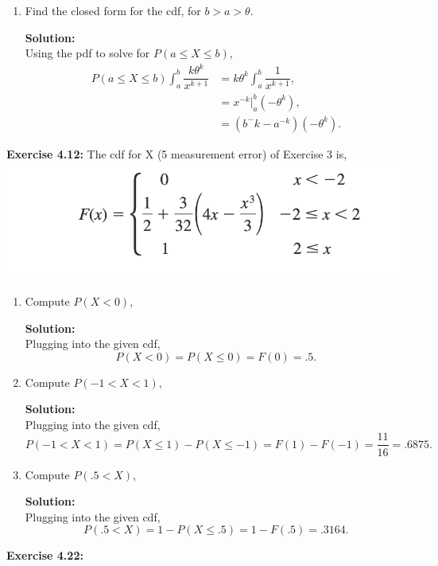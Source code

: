 \documentclass[12pt]{article}
\theoremstyle{homework}
\newcommand{\localhead}[1]{\par\smallskip\noindent\textbf{#1}\nobreak\\}%
\newcommand\solution{\localhead{Solution:}}
\begin{document}
\begin{enumerate}
\vspace{.25in}


\item Find the closed form for the cdf, for $b > a >\theta$.\\

\solution Using the pdf to solve for $P(a \le X \le b)$,
\begin{align*}
  P(a \le X \le b)\int_{a}^{b} \dfrac{k\theta^k}{x^{k+1}} &= k\theta^k \int_{a}^{b} \dfrac{1}{x^{k+1}},\\
  &= x^{-k}|_a^{b}(-\theta^k),\\
  &=(b^-k - a^{-k}) (-\theta^k).
\end{align*}

 \end{enumerate}

 \vspace{.5in}









 \hspace{.5in}\textbf{Exercise 4.12:} The cdf for X (5 measurement error) of Exercise 3 is,
 \center
 \includegraphics[width = \textwidth]{pdf2.png}
 \center
\begin{enumerate}
  \item Compute $P(X<0)$,
  \solution Plugging into the given cdf,
  \begin{equation*}
    P(X<0) = P(X \le 0) = F(0) = .5 .
  \end{equation*}
  \vspace{.25in}


  \item Compute $P(-1< X < 1)$,
  \solution Plugging into the given cdf,
  \begin{equation*}
    P(-1< X < 1) = P(X \le 1) - P(X \le -1)  = F(1) - F(-1) = \dfrac{11}{16} = .6875.
  \end{equation*}
  \vspace{.25in}



  \item Compute $P(.5 < X )$,
  \solution Plugging into the given cdf,
  \begin{equation*}
    P(.5 < X )= 1 - P(X \le .5)  = 1 - F(.5) = .3164.
  \end{equation*}
  \vspace{.25in}
\end{enumerate}











\hspace{.5in}\textbf{Exercise 4.22:} 
\end{document}
